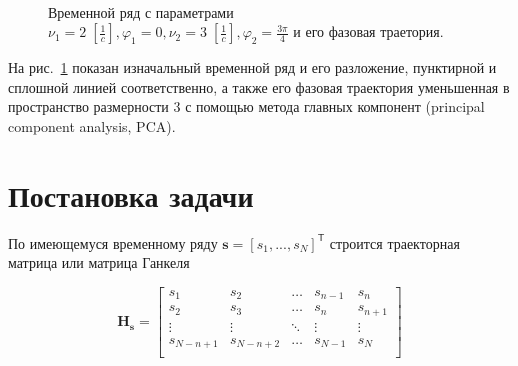 \documentclass[12pt,twoside]{article}
\begin{document}
\begin{figure}[h]
\centering
  \\
\caption{Временной ряд с параметрами $\nu_1 = 2\;[\frac{1}{c}], \varphi_1 = 0,\nu_2 = 3\;[\frac{1}{c}],\varphi_2 = \frac{3\pi}{4}$ и его фазовая траетория. }
\label{fg:initial_traj}
\end{figure}

На рис.~\ref{fg:initial_traj} показан изначальный временной ряд и его разложение, пунктирной и сплошной линией соответственно, а также его фазовая траектория уменьшенная в пространство размерности 3 с помощью метода главных компонент (principal component analysis, PCA).

\section{Постановка задачи}
По имеющемуся временному ряду $\mathbf{s}=[s_1,...,s_N]^{\mathsf{T}}$ строится траекторная матрица или матрица Ганкеля

\begin{equation}
\mathbf{H_{s}} = 
\begin{bmatrix} 
	s_{1} & s_{2} & \ldots &s_{n-1} &s_{n}\\
	s_{2} & s_{3} & \ldots &s_{n} &s_{n+1}\\
	\vdots& \vdots & \ddots & \vdots & \vdots\\
	s_{N-n+1} & s_{N-n+2} &\ldots&s_{N-1} &s_{N}\\
\end{bmatrix}
\label{eq:hankel_matrix}
\end{equation}
                   
\end{document}
